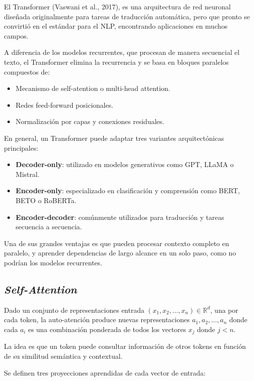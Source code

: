 El Transformer (Vaswani et al., 2017), es una arquitectura de red neuronal diseñada originalmente
para tareas de traducción automática, pero que pronto se convirtió en el estándar para el NLP, 
encontrando aplicaciones en muchos campos. 

A diferencia de los modelos recurrentes, que procesan de manera secuencial el texto, el Transformer
elimina la recurrencia y se basa en bloques paralelos compuestos de:

\begin{itemize}
    \item Mecanismo de self-atention o multi-head attention.
    \item Redes feed-forward posicionales.
    \item Normalización por capas y conexiones residuales.
\end{itemize}

En general, un Transformer puede adaptar tres variantes arquitectónicas principales:

\begin{itemize}
    \item \textbf{Decoder-only}: utilizado en modelos generativos como GPT, LLaMA o Mistral.
    \item \textbf{Encoder-only}: especializado en clasificación y comprensión como BERT, BETO o RoBERTa. 
    \item \textbf{Encoder-decoder}: comúnmente utilizados para traducción y tareas secuencia a secuencia.
\end{itemize}

Una de sus grandes ventajas es que pueden procesar contexto completo en paralelo, y aprender
dependencias de largo alcance en un solo paso, como no podrían los modelos recurrentes. 

\subsection{\textit{Self-Attention}}

Dado un conjunto de representaciones entrada $(x_1, x_2, \dots, x_n) \in \mathbb{R}^d$, una por 
cada token, la auto-atención produce nuevas representaciones $a_1, a_2, \dots, a_n$ donde cada
$a_i$ es una combinación ponderada de todos los vectores $x_j$ donde $j < n$.

La idea es que un token puede consultar información de otros tokens en función de su similitud
semántica y contextual.

Se definen tres proyecciones aprendidas de cada vector de entrada:

